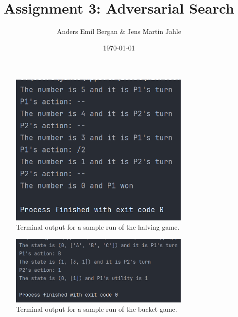 \documentclass[11pt]{article}
\begin{document}
\title{Assignment 3: Adversarial Search}
\author{Anders Emil Bergan \& Jens Martin Jahle}
\date{\today}
\maketitle

\clearpage
{}
\begin{figure}[H]
    \centering
    \includegraphics[width=0.8\textwidth]{Images/halving_game_terminal_output}
    \caption{Terminal output for a sample run of the halving game.}
    \label{fig:halving_game_terminal_output}
\end{figure}

\clearpage
{}

\begin{figure}[H]
    \centering
    \includegraphics[width=0.8\textwidth]{Images/bucket_game}
    \caption{Terminal output for a sample run of the bucket game.}
    \label{fig:sudoku_easy}
\end{figure}

\clearpage
{}
\end{document}
